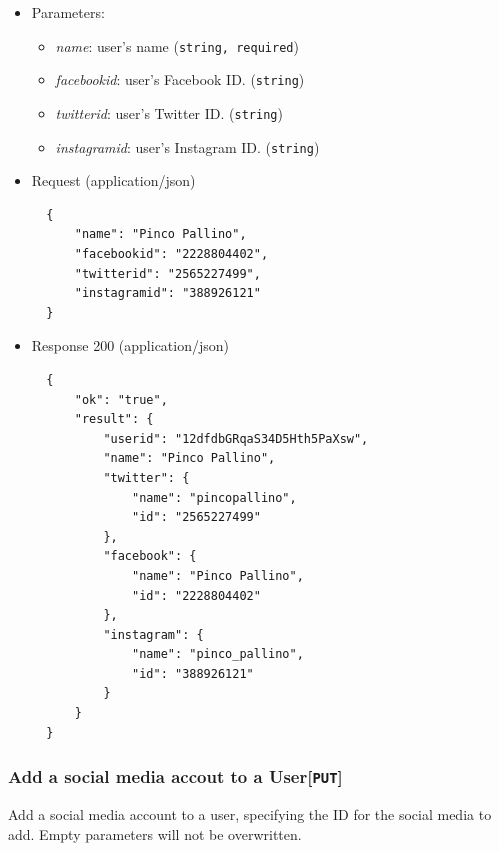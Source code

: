 \begin{itemize}
\item
  Parameters:

  \begin{itemize}
  \item
    \textit{name}: user's name (\texttt{string, required})
  \item
    \textit{facebookid}: user's Facebook ID. (\texttt{string})
  \item
    \textit{twitterid}: user's Twitter ID. (\texttt{string})
  \item
    \textit{instagramid}: user's Instagram ID. (\texttt{string})
  \end{itemize}
\item
  Request (application/json)

\begin{verbatim}
  {
      "name": "Pinco Pallino",
      "facebookid": "2228804402",
      "twitterid": "2565227499",
      "instagramid": "388926121"
  }
\end{verbatim}
\item
  Response 200 (application/json)

\begin{verbatim}
  {
      "ok": "true",
      "result": {
          "userid": "12dfdbGRqaS34D5Hth5PaXsw",
          "name": "Pinco Pallino",
          "twitter": {
              "name": "pincopallino",
              "id": "2565227499"
          },
          "facebook": {
              "name": "Pinco Pallino",
              "id": "2228804402"
          },
          "instagram": {
              "name": "pinco_pallino",
              "id": "388926121"
          }
      }
  }
\end{verbatim}
\end{itemize}

\subsubsection{Add a social media accout to a User{[}\protect\texttt{PUT}{]}}

Add a social media account to a user, specifying the ID for the social media to add. Empty parameters will not be overwritten.

